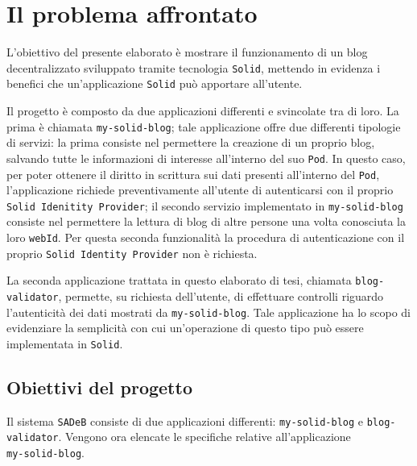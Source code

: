 
\chapter{Il problema affrontato}

\medskip

L'obiettivo del presente elaborato è mostrare il funzionamento di un blog decentralizzato sviluppato tramite tecnologia {\tt Solid}, mettendo in evidenza i benefici che un'applicazione {\tt Solid} può apportare all'utente.

\medskip

Il progetto è composto da due applicazioni differenti e svincolate tra di loro. La prima è chiamata {\tt my-solid-blog}; tale applicazione offre due differenti tipologie di servizi: la prima consiste nel permettere la creazione di un proprio blog, salvando tutte le informazioni di interesse all'interno del suo {\tt Pod}. In questo caso, per poter ottenere il diritto in scrittura sui dati presenti all'interno del {\tt Pod}, l'applicazione richiede preventivamente all'utente di autenticarsi con il proprio {\tt Solid Idenitity Provider}; il secondo servizio implementato in {\tt my-solid-blog} consiste nel permettere la lettura di blog di altre persone una volta conosciuta la loro {\tt webId}. Per questa seconda funzionalità la procedura di autenticazione  con il proprio {\tt Solid Identity Provider} non è richiesta.

\medskip

La seconda applicazione trattata in questo elaborato di tesi, chiamata {\tt blog-validator}, permette, su richiesta dell'utente, di effettuare controlli riguardo l'autenticità dei dati mostrati da {\tt my-solid-blog}. Tale applicazione ha lo scopo di evidenziare la semplicità con cui un'operazione di questo tipo può essere implementata in {\tt Solid}.

\bigskip

\section{Obiettivi del progetto}

\medskip

Il sistema {\tt SADeB} consiste di due applicazioni differenti: {\tt my-solid-blog} e {\tt blog-validator}. Vengono ora elencate le specifiche relative all'applicazione\\{\tt my-solid-blog}.

\medskip

